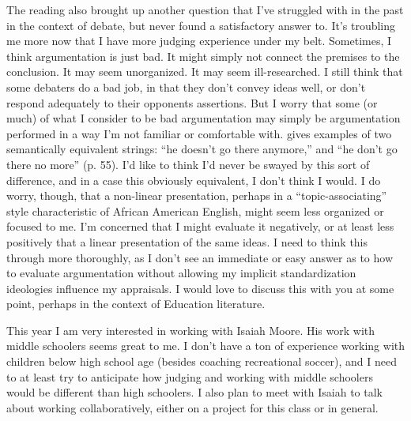 \documentclass[man,12pt]{apa6}
\begin{document}
The reading also brought up another question that I've struggled with in the
past in the context of debate, but never found a satisfactory answer to. It's
troubling me more now that I have more judging experience under my belt.
Sometimes, I think argumentation is just bad. It might simply not connect the
premises to the conclusion. It may seem unorganized. It may seem
ill-researched. I still think that some debaters do a bad job, in that they
don't convey ideas well, or don't respond adequately to their opponents
assertions. But I worry that some (or much) of what I consider to be bad
argumentation may simply be argumentation performed in a way I'm not familiar
or comfortable with. 
\citet{Lippi-Green11} gives examples of two semantically equivalent strings:
``he doesn't go there anymore,'' and ``he don't go there no more'' (p. 55).
I'd like to think I'd never be swayed by this sort of difference, and in a case
this obviously equivalent, I don't think I would. I do worry, though, that a
non-linear presentation, perhaps in a ``topic-associating''
\cite[p.~102]{CharityHudley10} style characteristic of African American
English, might seem less organized or focused to me. I'm concerned that I might
evaluate it negatively, or at least less positively that a linear presentation
of the same ideas. 
I need to think this through more thoroughly, as I don't see an immediate or
easy answer as to how to evaluate argumentation without allowing my implicit
standardization ideologies influence my appraisals. I would love to discuss
this with you at some point, perhaps in the context of Education literature. 

This year I am very interested in working with Isaiah Moore. His work with
middle schoolers seems great to me. 
I don't have a ton of experience working with children below high school age
(besides coaching recreational soccer), and I need to at least try to
anticipate how judging and working with middle schoolers would be different
than high schoolers. I also plan to meet with Isaiah to talk about working
collaboratively, either on a project for this class or in general. 

\clearpage



\end{document}
